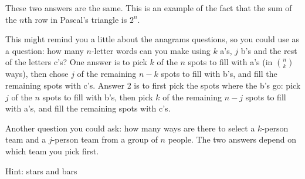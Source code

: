 \protect \documentclass [10pt]{exam}
\renewenvironment{Ans}[1]{\setcounter{question}{#1}\addtocounter{question}{-1}\question }{}
\begin{document}
\begin{questions}
\begin{Ans}{17}
    These two answers are the same.  This is an example of the fact that the sum of the $n$th row in Pascal's triangle is $2^n$.
	
\end{Ans}
\begin{Ans}{18}
		This might remind you a little about the anagrams questions, so you could use as a question: how many $n$-letter words can you make using $k$ a's, $j$ b's and the rest of the letters c's?  One answer is to pick $k$ of the $n$ spots to fill with a's (in ${n \choose k}$ ways), then chose $j$ of the remaining $n-k$ spots to fill with b's, and fill the remaining spots with c's.  Answer 2 is to first pick the spots where the b's go: pick $j$ of the $n$ spots to fill with b's, then pick $k$ of the remaining $n-j$ spots to fill with a's, and fill the remaining spots with c's.

		Another question you could ask: how many ways are there to select a $k$-person team and a $j$-person team from a group of $n$ people.  The two answers depend on which team you pick first.
	
\end{Ans}
\begin{Ans}{19}
		Hint: stars and bars%
	
\end{Ans}
\begin{Ans}{20}
\end{Ans}
\end{questions}
\end{document}
